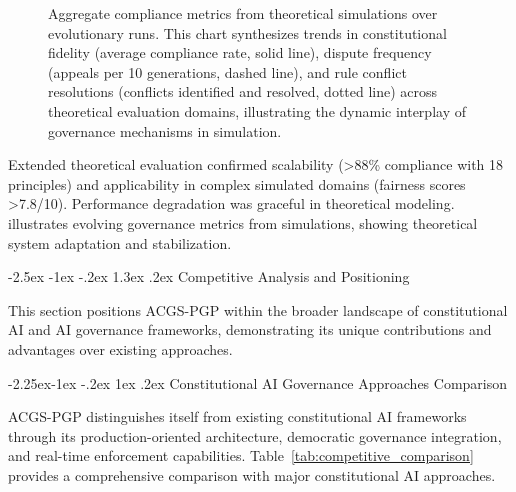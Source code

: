 \documentclass[manuscript,screen,9pt]{acmart}
\makeatletter
\renewcommand\section{\@startsection{section}{1}{\z@}%
  {-2.5ex \@plus -1ex \@minus -.2ex}%
  {1.3ex \@plus.2ex}%
  {\normalfont\Large\bfseries}}
\renewcommand\subsection{\@startsection{subsection}{2}{\z@}%
  {-2.25ex\@plus -1ex \@minus -.2ex}%
  {1ex \@plus .2ex}%
  {\normalfont\large\bfseries}}
\makeatother
\begin{document}
\FloatBarrier %
\begin{figure}[!htb]
\centering
\caption{Aggregate compliance metrics from theoretical simulations over evolutionary runs. This chart synthesizes trends in constitutional fidelity (average compliance rate, solid line), dispute frequency (appeals per 10 generations, dashed line), and rule conflict resolutions (conflicts identified and resolved, dotted line) across theoretical evaluation domains, illustrating the dynamic interplay of governance mechanisms in simulation.}
\label{fig:compliance-trends}
\end{figure}

Extended theoretical evaluation confirmed scalability (>88\% compliance with 18 principles) and applicability in complex simulated domains (fairness scores >7.8/10). Performance degradation was graceful in theoretical modeling.  illustrates evolving governance metrics from simulations, showing theoretical system adaptation and stabilization.

\section{Competitive Analysis and Positioning}
\label{sec:competitive_analysis}

This section positions ACGS-PGP within the broader landscape of constitutional AI and AI governance frameworks, demonstrating its unique contributions and advantages over existing approaches.

\subsection{Constitutional AI Governance Approaches Comparison}

ACGS-PGP distinguishes itself from existing constitutional AI frameworks through its production-oriented architecture, democratic governance integration, and real-time enforcement capabilities. Table~\ref{tab:competitive_comparison} provides a comprehensive comparison with major constitutional AI approaches.
\end{document}
